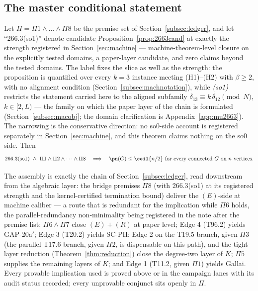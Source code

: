 \subsection{The master conditional statement}\label{subsec:modulo}

\begin{theorem}\label{thm:gallaimodulo}
Let $\Pi=\Pi1\wedge\dots\wedge\Pi8$ be the premise set of Section~\ref{subsec:ledger}, and let
``266.3(so1)'' denote candidate Proposition~\ref{prop:2663cand} at exactly the strength
registered in Section~\ref{sec:machine} --- machine-theorem-level closure on the explicitly
tested domains, a paper-layer candidate, and zero claims beyond the tested domains. The label
fixes the slice as well as the strength: the proposition is quantified over every $k=3$
instance meeting (H1)--(H2) with $\beta\ge2$, with no alignment condition
(Section~\ref{subsec:machnotation}), while \emph{(so1)} restricts the statement carried here
to the aligned subfamily $\delta_{13}\equiv k\,\delta_{12}\pmod N$, $k\in[2,L)$ --- the family
on which the paper layer of the chain is formulated (Section~\ref{subsec:macobj}; the domain
clarification is Appendix~\ref{app:mu2663}). The narrowing is the conservative direction: no
so0-side account is registered separately in Section~\ref{sec:machine}, and this theorem
claims nothing on the so0 side. Then
\[
\text{266.3(so1)}\ \wedge\ \Pi1\wedge\Pi2\wedge\dots\wedge\Pi8
\quad\Longrightarrow\quad
\pn(G)\le\ceil{n/2}\ \text{for every connected } G \text{ on } n \text{ vertices}.
\]
\end{theorem}

\begin{remark}[assembly]\label{rem:moduloassembly}
The assembly is exactly the chain of Section~\ref{subsec:ledger}, read downstream from the
algebraic layer: the bridge premises $\Pi8$ (with 266.3(so1) at its registered strength and
the kernel-certified termination bound) deliver the $(E)$-side at machine caliber --- a route
that is redundant for the implication while $\Pi6$ holds, the parallel-redundancy
non-minimality being registered in the note after the premise list;
$\Pi6\wedge\Pi7$ close $(E)+(R)$ at paper level; Edge 4 (T96.2) yields GAP-20a$'$; Edge 3
(T20.2) yields SC-PH; Edge 2 on the T19.5 branch, given $\Pi3$ (the parallel T17.6 branch,
given $\Pi2$, is dispensable on this path), and the tight-layer
reduction (Theorem~\ref{thm:reduction}) close the degree-two layer of $K$; $\Pi5$ supplies
the remaining layers of $K$; and Edge 1 (T11.2, given $\Pi1$) yields Gallai. Every provable
implication used is proved above or in the campaign lanes with its audit status recorded;
every unprovable conjunct sits openly in $\Pi$.
\end{remark}

